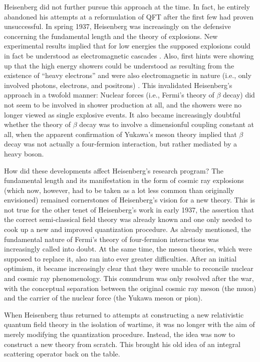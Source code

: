 \documentclass[12pt,a4paper]{article}
\begin{document}
Heisenberg did not further pursue this approach at the time. In fact, he entirely abandoned his attempts at a reformulation of QFT after the first few had proven unsuccessful. In spring 1937, Heisenberg was increasingly on the defensive concerning the fundamental length and the theory of explosions. New experimental results implied that for low energies the supposed explosions could in fact be understood as electromagnetic cascades  \citep{cassidy_1981_cosmic}. Also, first hints were showing up that the high energy showers could be understood as resulting from the existence of  ``heavy electrons'' and were also electromagnetic in nature (i.e., only involved photons, electrons, and positrons) \citep{galison_1983_the-discovery}. This invalidated Heisenberg's approach in a twofold manner: Nuclear forces (i.e., Fermi's theory of $\beta$ decay) did not seem to be involved in shower production at all, and the showers were no longer viewed as single explosive events.  It also became increasingly doubtful whether the theory of $\beta$ decay was to involve a dimensionful coupling constant at all, when the apparent confirmation of Yukawa's meson theory implied that $\beta$ decay was not actually a four-fermion interaction, but rather mediated by a heavy boson.

How did these developments affect Heisenberg's research program? The fundamental length and its manifestation in the form of cosmic ray explosions (which now, however, had to be taken as a lot less common than originally envisioned) remained cornerstones of Heisenberg's vision for a new theory. This is not true for the other tenet of Heisenberg's work in early 1937, the assertion that the correct semi-classical field theory was already known and one only needed to cook up a new and improved quantization procedure. As already mentioned, the fundamental nature of Fermi's theory of four-fermion interactions was increasingly called into doubt. At the same time, the meson theories, which were supposed to replace it, also ran into ever greater difficulties. After an initial optimism, it became increasingly clear that they were unable to reconcile nuclear and cosmic ray phenomenology. This conundrum was only resolved after the war, with the conceptual separation between the original cosmic ray meson (the muon) and the carrier of the nuclear force (the Yukawa meson or pion).

When Heisenberg thus returned to attempts at constructing a new relativistic quantum field theory in the isolation of wartime, it was no longer with the aim of merely modifying the quantization procedure. Instead, the idea was now to construct a new theory from scratch. This brought his old idea of an integral scattering operator back on the table. 
\end{document}
